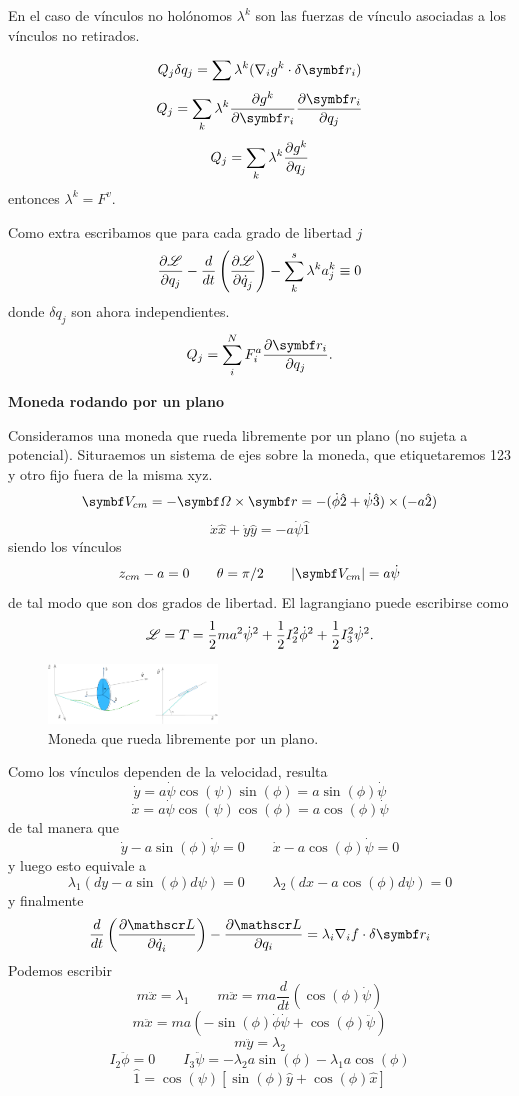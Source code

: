 \documentclass[10pt,oneside]{CBFT_book}
\begin{document}
En el caso de vínculos no holónomos $\lambda^k$ son las fuerzas de vínculo asociadas a los 
vínculos no retirados.

\[
	Q_j {\delta q_j} =  \sum \lambda^k (\nabla_i g^k\cdot\delta\vb{r}_i)
\]
\[
	Q_j =  \sum_k \lambda^k \dpar{g^k}{\vb{r}_i} \dpar{\vb{r}_i}{q_j}
\]
\[
	Q_j =  \sum_k \lambda^k \frac{\partial^{\hspace{-0.05em}} {g^k}}{\partial {q_j}^{\hspace{-0.05em}}}
\]
entonces $\lambda^k=F^v$.

Como extra escribamos que para cada grado de libertad $j$ 
\[
	\frac{\partial^{\hspace{-0.05em}} {\mathscr{L}}}{\partial {q_j}^{\hspace{-0.05em}}} - \frac{d}{dt}\left( \frac{\partial^{\hspace{-0.05em}} {\mathscr{L}}}{\partial {\dot{q}_j}^{\hspace{-0.05em}}} \right) - \sum_k^s \lambda^k a_j^k \equiv 0
\]
donde $\delta q_j$ son ahora independientes.
\[
	Q_j = \sum_i^N F_i^a \dpar{\vb{r}_i}{q_j}. 
\]

\begin{ejemplo}{\bf Moneda rodando por un plano}

Consideramos una moneda que rueda libremente por un plano (no sujeta a potencial).
Situraemos un sistema de ejes sobre la moneda, que etiquetaremos 123 y otro fijo fuera
de la misma xyz.
\[
	\vb{V}_{cm} = -\vb{\Omega} \times \vb{r} =
	-(\dot{\phi}\hat{2} + \dot{\psi}\hat{3}) \times (-a\hat{2})
\]
\[
	\dot{x}\hat{x} + \dot{y}\hat{y} = -a \dot{\psi}\hat{1}
\]
siendo los vínculos
\[
	z_{cm} - a = 0 \qquad \theta=\pi/2 \qquad |\vb{V}_{cm}| = a\dot{\psi}
\]
de tal modo que son dos grados de libertad. El lagrangiano puede escribirse como 
\[
	\mathscr{L} = T = \frac{1}{2}m a^2 \dot{\psi}^2  + \frac{1}{2} I_2^2 \dot{\phi}^2 + \frac{1}{2} I_3^2\dot{\psi}^2.
\]

\begin{figure}
	\begin{center}
	\includegraphics[width=0.4\textwidth]{images/fig_moneda.pdf}	 
	\end{center}
	\caption{Moneda que rueda libremente por un plano.}
\end{figure} 

Como los vínculos dependen de la velocidad, resulta 
\[
	\dot{y} = a\dot{\psi} \cos(\psi) \sin(\phi) = a \sin(\phi) \dot{\psi}
\]
\[
	\dot{x} = a\dot{\psi} \cos(\psi) \cos(\phi) = a \cos(\phi) \dot{\psi}
\]
de tal manera que 
\[
	\dot{y} - a \sin(\phi) \dot{\psi} = 0 \qquad \dot{x} - a \cos(\phi) \dot{\psi} = 0
\]
y luego esto equivale a 
\[
	\lambda_1(dy - a \sin(\phi) d\psi) = 0 \qquad \lambda_2(dx - a \cos(\phi) d\psi)= 0
\]
y finalmente 
\[
	\frac{d}{dt}\left(\dpar{\Lag}{\dot{q}_i}\right) - \dpar{\Lag}{q_i} =
	\lambda_i \nabla_i f \cdot \delta \vb{r}_i
\]
Podemos escribir
\[
	m \ddot{x} = \lambda_1 \qquad m \ddot{x} = m a \frac{d}{dt}( \cos(\phi)\dot{\psi} )
\]
\[
	m \ddot{x} = m a ( -\sin(\phi)\dot{\phi}\dot{\psi} + \cos(\phi)\ddot{\psi} )
\]
\[
	m \ddot{y} = \lambda_2
\]
\[
	I_2\ddot{\phi} = 0 \qquad I_3\ddot{\psi} = - \lambda_2 a \sin(\phi) -\lambda_1 a \cos(\phi)
\]
\[
	\hat{1} = \cos(\psi)[\sin(\phi)\hat{y} + \cos(\phi)\hat{x}]
\]


\end{ejemplo}
\end{document}
